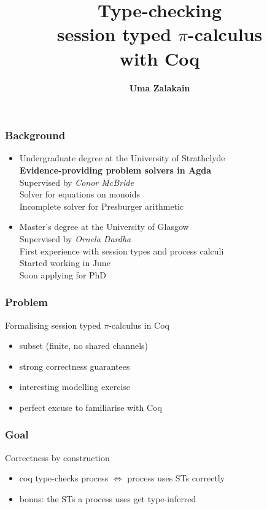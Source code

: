 \documentclass{beamer}
\title{
    Type-checking \\
    session typed $\pi$-calculus \\
    with Coq\\
}
\author{\textbf{Uma Zalakain}}
\institute{University of Glasgow}
\date{}
\begin{document}
\begin{frame}
    \titlepage
\end{frame}

\begin{frame}
    \frametitle{Background}
    \begin{itemize}
        \item Undergraduate degree at the University of Strathclyde\\
            {\small
            \textbf{Evidence-providing problem solvers in Agda} \\
            Supervised by \textit{Conor McBride} \\
            \scriptsize Solver for equations on monoids\\
            Incomplete solver for Presburger arithmetic \\
            }
        \item Master's degree at the University of Glasgow\\
            Supervised by \textit{Ornela Dardha} \\
            {\scriptsize
            First experience with session types and process calculi \\
            Started working in June \\
            Soon applying for PhD \\
            }
    \end{itemize}
\end{frame}

\begin{frame}
    \frametitle{Problem}
    \begin{block}{Formalising session typed $\pi$-calculus in Coq}
        \begin{itemize}
            \item subset (finite, no shared channels)
            \item strong correctness guarantees
            \item interesting modelling exercise
            \item perfect excuse to familiarise with Coq
        \end{itemize}
    \end{block}
\end{frame}

\begin{frame}
    \frametitle{Goal}
    \begin{block}{Correctness by construction}
        \begin{itemize}
            \item coq type-checks process $\iff$ process uses STs correctly
            \item bonus: the STs a process uses get type-inferred
        \end{itemize}
    \end{block}
\end{frame}
\end{document}
